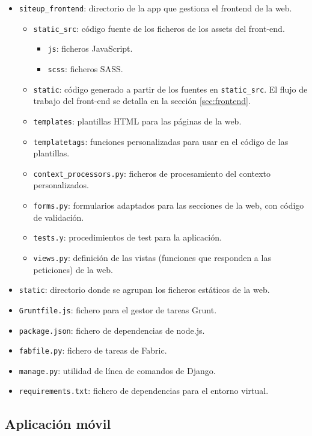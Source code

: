 \begin{itemize}
\item \texttt{siteup\_frontend}: directorio de la app que gestiona el frontend de la web.
  \begin{itemize}
  \item \texttt{static\_src}: código fuente de los ficheros de los assets del front-end.
    \begin{itemize}
    \item \texttt{js}: ficheros JavaScript.
    \item \texttt{scss}: ficheros SASS.
    \end{itemize}
  \item \texttt{static}: código generado a partir de los fuentes en
    \texttt{static\_src}. El flujo de trabajo del front-end se detalla en la sección \ref{sec:frontend}.
  \item \texttt{templates}: plantillas HTML para las páginas de la web.
  \item \texttt{templatetags}: funciones personalizadas para usar en el código
    de las plantillas.
  \item \texttt{context\_processors.py}: ficheros de procesamiento del contexto
    personalizados.
  \item \texttt{forms.py}: formularios adaptados para las secciones de la web, con código de validación.
  \item \texttt{tests.y}: procedimientos de test para la aplicación.
  \item \texttt{views.py}: definición de las vistas (funciones que responden a
    las peticiones) de la web.
  \end{itemize}
\item \texttt{static}: directorio donde se agrupan los ficheros estáticos de la web.
\item \texttt{Gruntfile.js}: fichero para el gestor de tareas Grunt.
\item \texttt{package.json}: fichero de dependencias de node.js.
\item \texttt{fabfile.py}: fichero de tareas de Fabric.
\item \texttt{manage.py}: utilidad de línea de comandos de Django.
\item \texttt{requirements.txt}: fichero de dependencias para el entorno virtual.
\end{itemize}

\subsection{Aplicación móvil}

